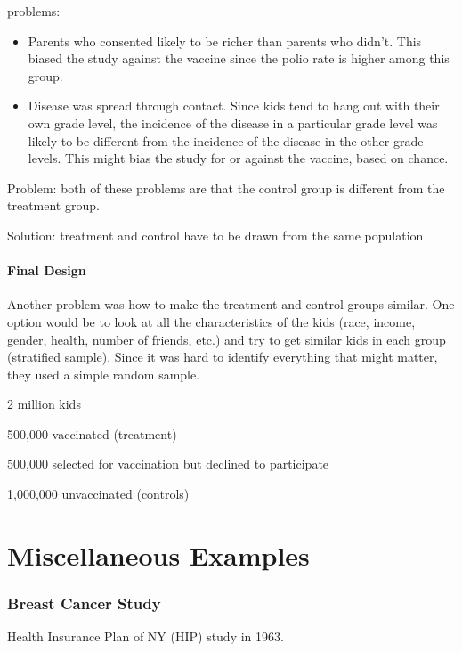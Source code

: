 \documentclass[landscape]{exam}
\begin{document}
  problems:
  \begin{itemize}

    \item Parents who consented likely to be richer than parents who didn't.
      This biased the study against the vaccine since the polio rate is higher
      among this group.

    \item Disease was spread through contact.  Since kids tend to hang out with
      their own grade level, the incidence of the disease in a particular grade
      level was likely to be different from the incidence of the disease in the
      other grade levels. This might bias the study for or against the vaccine,
      based on chance.
  \end{itemize}

  Problem: both of these problems are that the control group is different from the
  treatment group.

  Solution: treatment and control have to be drawn from the same population

  \subsection{Final Design}
  Another problem was how to make the treatment and control groups similar.  One
  option would be to look at all the characteristics of the kids (race, income,
  gender, health, number of friends, etc.) and try to get similar kids in each
  group (stratified sample).  Since it was hard to identify everything that
  might matter, they used a simple random sample.

  \begin{itemize*}
    \item 2 million kids
    \item 500,000 vaccinated (treatment)
    \item 500,000 selected for vaccination but declined to participate
    \item 1,000,000 unvaccinated (controls)
  \end{itemize*}


  \part{Miscellaneous Examples}
  \section{Breast Cancer Study}
  Health Insurance Plan of NY (HIP) study in 1963.
\end{document}
